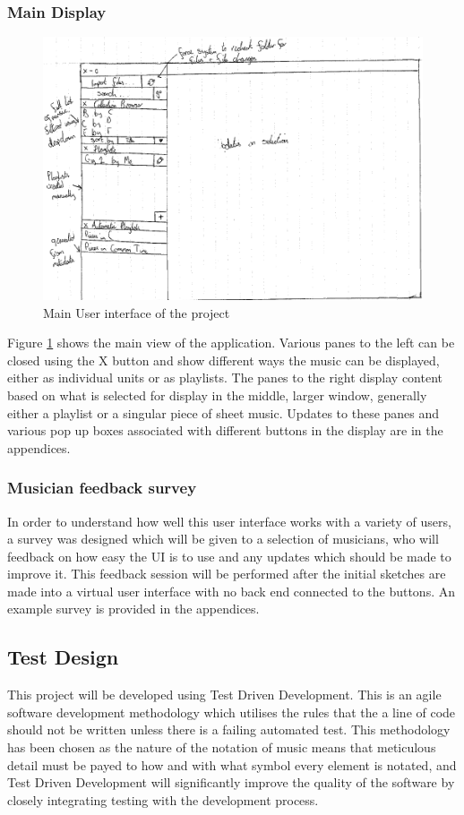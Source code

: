 \subsubsection{Main Display}
\begin{figure}[H]
    \includegraphics[width=400pt]{designs/main}
    \caption{Main User interface of the project}
    \label{fig:main}
\end{figure}
Figure \ref{fig:main} shows the main view of the application. Various panes to the left can be closed using the X button and show different ways the music can be displayed, either as individual units or as playlists. The panes to the right display content based on what is selected for display in the middle, larger window, generally either a playlist or a singular piece of sheet music. Updates to these panes and various pop up boxes associated with different buttons in the display are in the appendices.
\subsubsection{Musician feedback survey}
In order to understand how well this user interface works with a variety of users, a survey was designed which will be given to a selection of musicians, who will feedback on how easy the UI is to use and any updates which should be made to improve it. This feedback session will be performed after the initial sketches are made into a virtual user interface with no back end connected to the buttons. An example survey is provided in the appendices.
\subsection{Test Design}
This project will be developed using Test Driven Development. This is an agile software development methodology which utilises the rules that the a line of code should not be written unless there is a failing automated test\parencite{TDD}. This methodology has been chosen as the nature of the notation of music means that meticulous detail must be payed to how and with what symbol every element is notated, and Test Driven Development will significantly improve the quality of the software by closely integrating testing with the development process.

